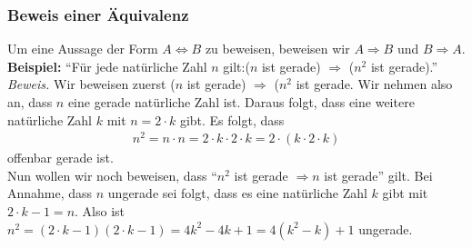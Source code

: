 \subsubsection{Beweis einer Äquivalenz}
\begin{minipage}{0.9\linewidth}
Um eine Aussage der Form $A \Leftrightarrow B$ zu beweisen, beweisen wir $A \Rightarrow B$ und $B \Rightarrow A$.\\
\textbf{Beispiel:} ``Für jede natürliche Zahl $n$ gilt:($n$ ist gerade) $\Rightarrow$ ($n^2$ ist gerade).'' \\
\textit{Beweis.} Wir beweisen zuerst ($n$ ist gerade) $\Rightarrow$ ($n^2$ ist gerade. Wir nehmen also an, dass $n$ eine gerade natürliche Zahl ist. Daraus folgt, dass eine weitere natürliche Zahl $k$ mit $n=2\cdot k$ gibt.
Es folgt, dass
\begin{align*}
 n^2 = n\cdot n = 2 \cdot k \cdot 2 \cdot k = 2 \cdot 
 (k \cdot 2 \cdot k)
\end{align*}
offenbar gerade ist. \\
Nun wollen wir noch beweisen, dass ``$n^2$ ist gerade $\Rightarrow n$ ist gerade'' gilt. Bei Annahme, dass $n$ ungerade sei folgt, dass es eine natürliche Zahl $k$ gibt mit $2 \cdot k - 1 = n$. Also ist $n^2 = (2 \cdot k - 1)(2 \cdot k - 1) = 4k^2-4k+1=4(k^2-k)+1$ ungerade.
\end{minipage}


